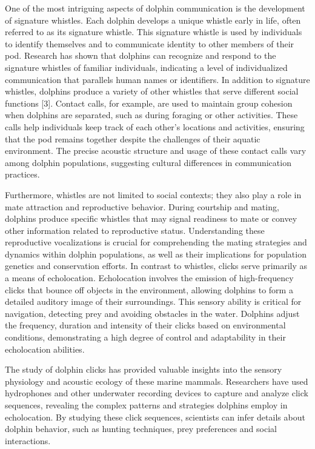 \documentclass{article}
\begin{document}
\begin{multicols}{2}
One of the most intriguing aspects of dolphin communication is the development of signature whistles. Each dolphin develops a unique whistle early in life, often referred to as its signature whistle. This signature whistle is used by individuals to identify themselves and to communicate identity to other members of their pod. Research has shown that dolphins can recognize and respond to the signature whistles of familiar individuals, indicating a level of individualized communication that parallels human names or identifiers. In addition to signature whistles, dolphins produce a variety of other whistles that serve different social functions [3]. Contact calls, for example, are used to maintain group cohesion when dolphins are separated, such as during foraging or other activities. These calls help individuals keep track of each other's locations and activities, ensuring that the pod remains together despite the challenges of their aquatic environment. The precise acoustic structure and usage of these contact calls vary among dolphin populations, suggesting cultural differences in communication practices.

Furthermore, whistles are not limited to social contexts; they also play a role in mate attraction and reproductive behavior. During courtship and mating, dolphins produce specific whistles that may signal readiness to mate or convey other information related to reproductive status. Understanding these reproductive vocalizations is crucial for comprehending the mating strategies and dynamics within dolphin populations, as well as their implications for population genetics and conservation efforts. In contrast to whistles, clicks serve primarily as a means of echolocation. Echolocation involves the emission of high-frequency clicks that bounce off objects in the environment, allowing dolphins to form a detailed auditory image of their surroundings. This sensory ability is critical for navigation, detecting prey and avoiding obstacles in the water. Dolphins adjust the frequency, duration and intensity of their clicks based on environmental conditions, demonstrating a high degree of control and adaptability in their echolocation abilities.

The study of dolphin clicks has provided valuable insights into the sensory physiology and acoustic ecology of these marine mammals. Researchers have used hydrophones and other underwater recording devices to capture and analyze click sequences, revealing the complex patterns and strategies dolphins employ in echolocation. By studying these click sequences, scientists can infer details about dolphin behavior, such as hunting techniques, prey preferences and social interactions.


\end{multicols}
\end{document}
